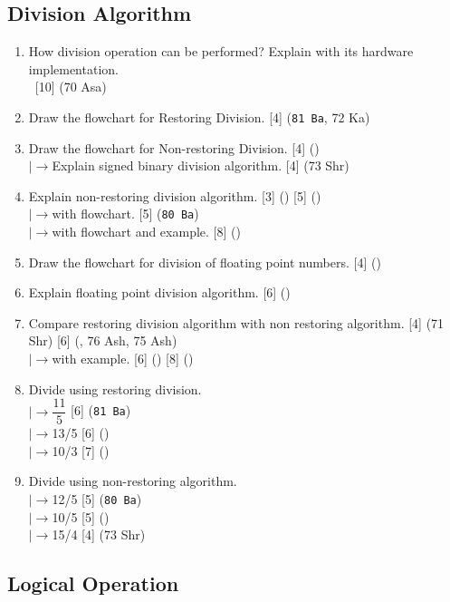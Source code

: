 \documentclass[12pt]{article}
\newcommand{\lb}{\\$\left|\rightarrow\right.$}
\newcommand{\enter}{\\\textcolor{white}{1}}
\begin{document}
	\subsection{Division Algorithm}
		\begin{enumerate}[noitemsep, topsep=0pt]
			\item How division operation can be performed? Explain with its hardware implementation. 
			\enter\hfill [10] (70 Asa)		
		
			\item Draw the flowchart for Restoring Division. \hfill [4] (\texttt{81 Ba}, 72 Ka)
			
			\item Draw the flowchart for Non-restoring Division. \hfill [4] ()
			\lb Explain signed binary division algorithm. \hfill [4] (73 Shr)
			
			\item Explain non-restoring division algorithm. \hfill [3] () [5] ()
			\lb with flowchart. \hfill [5] (\texttt{80 Ba})
			\lb with flowchart and example. \hfill [8] ()
			
			\item Draw the flowchart for division of floating point numbers. \hfill [4] ()
			
			\item Explain floating point division algorithm. \hfill [6] ()
			
			\item Compare restoring division algorithm with non restoring algorithm. \hfill [4] (71 Shr) [6] (, 76 Ash, 75 Ash)
			\lb with example. \hfill [6] () [8] ()
			
			\item Divide using restoring division. 
				\lb $\dfrac{11}{5}$ \hfill [6] (\texttt{81 Ba})
				\lb 13/5 \hfill [6] ()
				\lb 10/3 \hfill [7] ()

			\item Divide using non-restoring algorithm.
				\lb 12/5 \hfill [5] (\texttt{80 Ba})
				\lb 10/5 \hfill [5] ()
				\lb 15/4 \hfill [4] (73 Shr)
		\end{enumerate}
	\subsection{Logical Operation}

	\pagebreak
	
\end{document}
